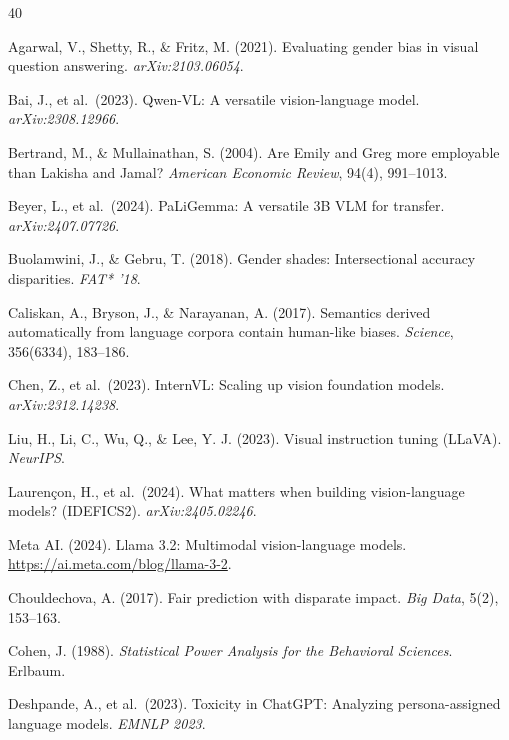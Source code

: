 \documentclass[letterpaper]{article} %
\begin{document}
\begin{thebibliography}{40}

Agarwal, V., Shetty, R., \& Fritz, M. (2021).
Evaluating gender bias in visual question answering.
\textit{arXiv:2103.06054}.

Bai, J., et al.\ (2023).
Qwen-VL: A versatile vision-language model.
\textit{arXiv:2308.12966}.

Bertrand, M., \& Mullainathan, S. (2004).
Are Emily and Greg more employable than Lakisha and Jamal?
\textit{American Economic Review}, 94(4), 991--1013.

Beyer, L., et al.\ (2024).
PaLiGemma: A versatile 3B VLM for transfer.
\textit{arXiv:2407.07726}.

Buolamwini, J., \& Gebru, T. (2018).
Gender shades: Intersectional accuracy disparities.
\textit{FAT* '18}.

Caliskan, A., Bryson, J., \& Narayanan, A. (2017).
Semantics derived automatically from language corpora contain human-like biases.
\textit{Science}, 356(6334), 183--186.

Chen, Z., et al.\ (2023).
InternVL: Scaling up vision foundation models.
\textit{arXiv:2312.14238}.

Liu, H., Li, C., Wu, Q., \& Lee, Y. J. (2023).
Visual instruction tuning (LLaVA).
\textit{NeurIPS}.

Lauren\c{c}on, H., et al.\ (2024).
What matters when building vision-language models? (IDEFICS2).
\textit{arXiv:2405.02246}.

Meta AI. (2024).
Llama 3.2: Multimodal vision-language models.
\url{https://ai.meta.com/blog/llama-3-2}.

Chouldechova, A. (2017).
Fair prediction with disparate impact.
\textit{Big Data}, 5(2), 153--163.

Cohen, J. (1988).
\textit{Statistical Power Analysis for the Behavioral Sciences}.
Erlbaum.

Deshpande, A., et al.\ (2023).
Toxicity in ChatGPT: Analyzing persona-assigned language models.
\textit{EMNLP 2023}.


\end{thebibliography}
\end{document}
